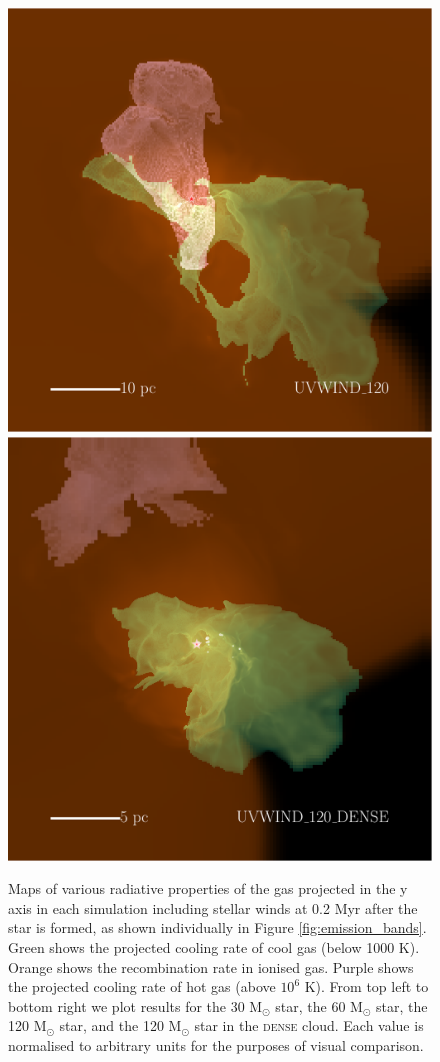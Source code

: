 \documentclass[a4paper,fleqn,usenatbib]{mnras}
\newcommand{\Msolar}{M$_{\odot}$\xspace}
\begin{document}
\begin{figure}
	\includegraphics[width=0.99\columnwidth]{plots/fig11c.pdf} \includegraphics[width=0.99\columnwidth]{plots/fig11d.pdf}
	\caption{Maps of various radiative properties of the gas projected in the y axis in each simulation including stellar winds at 0.2 Myr after the star is formed, as shown individually in Figure \ref{fig:emission_bands}. Green shows the projected cooling rate of cool gas (below 1000 K). Orange shows the recombination rate in ionised gas. Purple shows the projected cooling rate of hot gas (above $10^6$ K). From top left to bottom right we plot results for the 30 \Msolar star, the 60 \Msolar star, the 120 \Msolar star, and the 120 \Msolar star in the \textsc{dense} cloud. Each value is normalised to arbitrary units for the purposes of visual comparison.}
	\label{fig:observability_yproj}
\end{figure}
\end{document}

